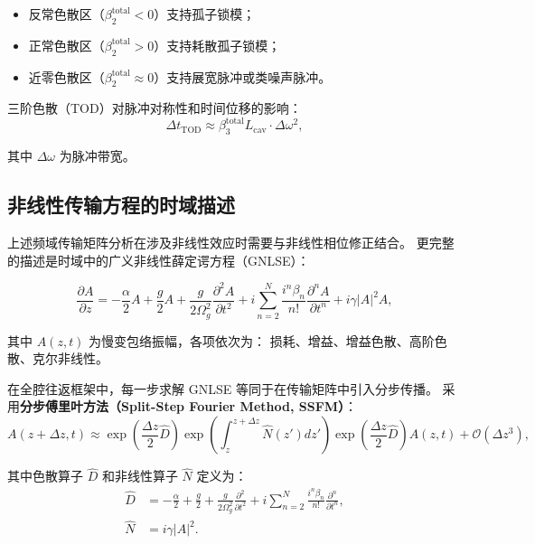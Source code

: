 \documentclass[11pt,a4paper]{ctexart}
\begin{document}
\begin{itemize}
  \item 反常色散区（$\beta_2^{\text{total}} < 0$）支持孤子锁模；
  \item 正常色散区（$\beta_2^{\text{total}} > 0$）支持耗散孤子锁模；
  \item 近零色散区（$\beta_2^{\text{total}} \approx 0$）支持展宽脉冲或类噪声脉冲。
\end{itemize}

三阶色散（TOD）对脉冲对称性和时间位移的影响：
\begin{equation}
  \Delta t_{\text{TOD}} \approx \beta_3^{\text{total}} L_{\text{cav}} \cdot \Delta\omega^2,
  \label{eq:TOD_shift}
\end{equation}

其中 $\Delta\omega$ 为脉冲带宽。

\subsection{非线性传输方程的时域描述}

上述频域传输矩阵分析在涉及非线性效应时需要与非线性相位修正结合。
更完整的描述是时域中的广义非线性薛定谔方程（GNLSE）：

\begin{equation}
  \boxed{
  \frac{\partial A}{\partial z}
  = -\frac{\alpha}{2}A
  + \frac{g}{2}A
  + \frac{g}{2\Omega_g^2}\frac{\partial^2 A}{\partial t^2}
  + i\sum_{n=2}^{N} \frac{i^n \beta_n}{n!}\frac{\partial^n A}{\partial t^n}
  + i\gamma |A|^2 A,
  }
  \label{eq:GNLSE}
\end{equation}

其中 $A(z,t)$ 为慢变包络振幅，各项依次为：
损耗、增益、增益色散、高阶色散、克尔非线性。

在全腔往返框架中，每一步求解 GNLSE 等同于在传输矩阵中引入分步传播。
采用\textbf{分步傅里叶方法（Split-Step Fourier Method, SSFM）}：
\begin{equation}
  A(z+\Delta z, t) \approx
  \exp\!\left(\frac{\Delta z}{2}\hat{D}\right)
  \exp\!\left(\int_z^{z+\Delta z} \hat{N}(z') dz'\right)
  \exp\!\left(\frac{\Delta z}{2}\hat{D}\right)
  A(z,t) + \mathcal{O}(\Delta z^3),
  \label{eq:SSFM}
\end{equation}

其中色散算子 $\hat{D}$ 和非线性算子 $\hat{N}$ 定义为：
\begin{align}
  \hat{D} &= -\frac{\alpha}{2} + \frac{g}{2}
            + \frac{g}{2\Omega_g^2}\frac{\partial^2}{\partial t^2}
            + i\sum_{n=2}^{N} \frac{i^n\beta_n}{n!}\frac{\partial^n}{\partial t^n}, \\[4pt]
  \hat{N} &= i\gamma|A|^2.
  \label{eq:DN_operators}
\end{align}
\end{document}
